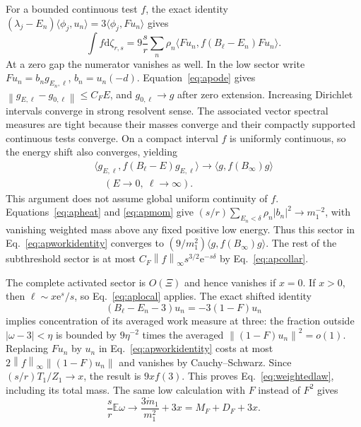 \documentclass[aps,pra,reprint,superscriptaddress,longbibliography]{revtex4-2}
\newcommand{\dd}{\mathrm d}
\newcommand{\ee}{\mathrm e}
\newcommand{\norm}[1]{\left\lVert#1\right\rVert}
\newcommand{\ip}[2]{\langle#1,#2\rangle}
\begin{document}
For a bounded continuous test $f$, the exact identity
$(\lambda_j-E_n)\ip{\phi_j}{u_n}=3\ip{\phi_j}{Fu_n}$ gives
\begin{equation}
 \int f\dd\zeta_{r,s}
 =9\frac sr\sum_n\rho_n
                   \ip{Fu_n}{f(B_\ell-E_n)Fu_n}.         \label{eq:apworkidentity}
\end{equation}
At a zero gap the numerator vanishes as well. In the low sector write
$Fu_n=b_ng_{E_n,\ell}$, $b_n=u_n(-d)$. Equation~\eqref{eq:apode}
gives $\norm{g_{E,\ell}-g_{0,\ell}}\le C_FE$, and
$g_{0,\ell}\to g$ after zero extension. Increasing Dirichlet intervals
converge in strong resolvent sense. The associated vector spectral
measures are tight because their masses converge and their compactly
supported continuous tests converge. On a compact interval $f$ is
uniformly continuous, so the energy shift also converges, yielding
\begin{equation}
 \begin{gathered}
 \ip{g_{E,\ell}}{f(B_\ell-E)g_{E,\ell}}
       \longrightarrow\ip{g}{f(B_\infty)g}\\
                       \quad(E\to0,\ \ell\to\infty).
 \end{gathered}                                         \label{eq:apshift}
\end{equation}
This argument does not assume global uniform continuity of $f$.
Equations~\eqref{eq:apheat} and \eqref{eq:apmom} give
$(s/r)\sum_{E_n<\delta}\rho_n|b_n|^2\to m_1^{-2}$, with vanishing
weighted mass above any fixed positive low energy. Thus this sector
in Eq.~\eqref{eq:apworkidentity} converges to
$(9/m_1^2)\ip{g}{f(B_\infty)g}$. The rest of the subthreshold
sector is at most $C_F\norm f_\infty s^{3/2}\ee^{-s\delta}$ by
Eq.~\eqref{eq:apcollar}.

The complete activated sector is $O(\Xi)$ and hence vanishes if
$x=0$. If $x>0$, then $\ell\sim x\ee^s/s$, so
Eq.~\eqref{eq:aplocal} applies. The exact shifted identity
\begin{equation}
       (B_\ell-E_n-3)u_n=-3(1-F)u_n                       \label{eq:apshiftthree}
\end{equation}
implies concentration of its averaged work measure at three: the
fraction outside $|\omega-3|<\eta$ is bounded by $9\eta^{-2}$ times
the averaged $\norm{(1-F)u_n}^2=o(1)$. Replacing $Fu_n$ by $u_n$
in Eq.~\eqref{eq:apworkidentity} costs at most
$2\norm f_\infty\norm{(1-F)u_n}$ and vanishes by Cauchy--Schwarz.
Since $(s/r)T_1/Z_1\to x$, the result is $9xf(3)$. This proves
Eq.~\eqref{eq:weightedlaw}, including its total mass. The same low
calculation with $F$ instead of $F^2$ gives
\begin{equation}
 \frac sr\mathbb E\omega\to\frac{3\dot m_1}{m_1^2}+3x
                              =M_F+D_F+3x.               \label{eq:apsigned}
\end{equation}
\end{document}
